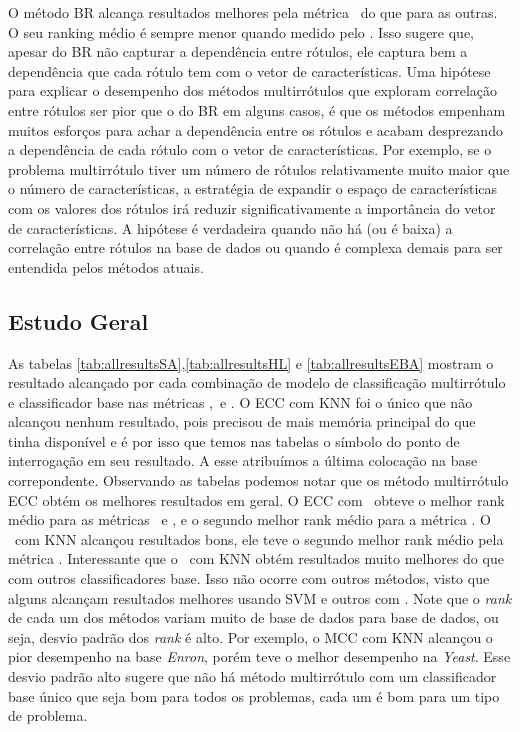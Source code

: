 O método BR alcança resultados melhores pela métrica \HL~do que para as outras.
O seu ranking médio é sempre menor quando medido pelo \HL. Isso sugere que, apesar
do BR não capturar a dependência entre rótulos, ele captura bem a dependência
que cada rótulo tem com o vetor de características. Uma hipótese para explicar
o desempenho dos métodos multirrótulos que exploram correlação entre rótulos ser
pior que o do BR em alguns casos, é que os métodos empenham muitos esforços para 
achar a dependência entre os rótulos e acabam desprezando a dependência de cada
rótulo com o vetor de características. 
Por exemplo, se o problema multirrótulo tiver um número de rótulos relativamente muito maior 
que o número de características, a estratégia de expandir o espaço de características com 
os valores dos rótulos irá reduzir significativamente a importância do vetor de características.
A hipótese é verdadeira quando não há (ou é baixa) a correlação entre rótulos
na base de dados ou quando é complexa demais para ser entendida pelos métodos atuais.



\FloatBarrier
\subsection{Estudo Geral}

As tabelas \ref{tab:allresultsSA},\ref{tab:allresultsHL} e \ref{tab:allresultsEBA} mostram o  resultado alcançado
por cada combinação de modelo de classificação multirrótulo e classificador base nas métricas \SA,\HL~e \EBA.
O ECC com KNN foi o único que não alcançou nenhum resultado, pois precisou de mais memória principal do que
tinha disponível e é por isso que temos nas tabelas o símbolo do ponto de interrogação em seu resultado.
A esse atribuímos a última colocação na base correpondente.
Observando as tabelas podemos notar
que os método multirrótulo ECC obtém os melhores resultados em geral. O ECC com \jqo~obteve o 
melhor rank médio para as métricas \SA~e \HL, e o segundo melhor rank médio para a métrica \EBA.
O \MRLMa~com KNN alcançou resultados bons, ele teve o segundo melhor rank médio pela métrica \SA.
Interessante que o \MRLMa~com KNN obtém resultados muito melhores do que com outros classificadores base.
Isso não ocorre com outros métodos, visto que alguns alcançam resultados melhores usando SVM e outros com \jqo.
Note que o \textit{rank} de cada um dos métodos variam muito de base de dados para base de dados, ou seja, desvio padrão
dos \textit{rank} é alto. Por exemplo, o MCC com KNN alcançou o pior desempenho na base \textit{Enron}, porém 
teve o melhor desempenho na \textit{Yeast}. Esse desvio padrão alto sugere que não há método multirrótulo 
com um classificador base único que
seja bom para todos os problemas, cada um é bom para um tipo de problema.


